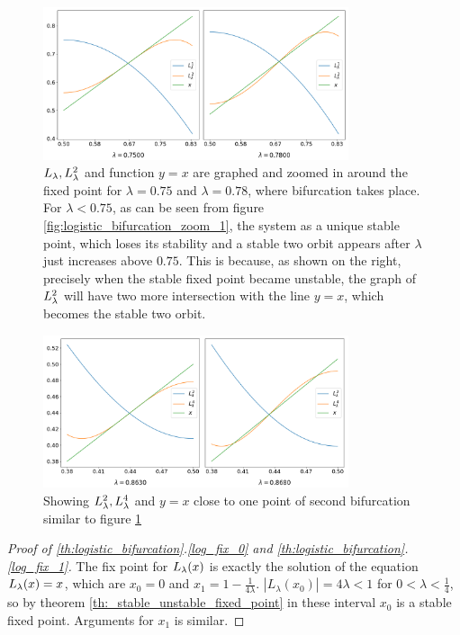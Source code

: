 \begin{figure}[htbp]
	\centering
	\includegraphics[width=0.8\textwidth]{./figures/logistic_map_around_bifurcation.png}
	\caption{
		$L_{\lambda}, L_{\lambda}^2$ and function $y=x$ are graphed and zoomed in around the fixed point for $\lambda = 0.75$ and $\lambda = 0.78$, where bifurcation takes place.
		For $\lambda < 0.75$, as can be seen from figure \ref{fig:logistic_bifurcation_zoom_1}, the system as a unique stable point,
		which loses its stability and a stable two orbit appears after $\lambda$ just increases above $0.75$.
		This is because, as shown on the right, precisely when the stable fixed point became unstable, the graph of $L_{\lambda}^2$ will have two more intersection with the line $y=x$, which becomes the stable two orbit.
	}
	\label{fig:point_of_bifurcation1}
\end{figure}

\begin{figure}[htbp]
	\centering
	\includegraphics[width=0.8\textwidth]{./figures/logistic_map_around_bifurcation_2.png}
	\caption{Showing $L_{\lambda}^2, L_{\lambda}^4$ and $y=x$ close to one point of second bifurcation similar to figure \ref{fig:point_of_bifurcation1}}
	\label{fig:point_of_bifurcation2}
\end{figure}

\begin{proof}[Proof of \ref{th:logistic_bifurcation}.\ref{log_fix_0} and \ref{th:logistic_bifurcation}.\ref{log_fix_1}]
	The fix point for $L_{\lambda}(x)$ is exactly the solution of the equation $L_{\lambda}(x) = x$, which are $x_0 = 0$ and $x_1 = 1 - \frac{1}{4\lambda}$. 
	$|L_{\lambda}(x_0) | = 4 \lambda < 1$ for $0 < \lambda < \frac{1}{4}$, so by theorem \ref{th:_stable_unstable_fixed_point} in these interval $x_0$ is a stable fixed point.
	Arguments for $x_1$ is similar.
\end{proof}

